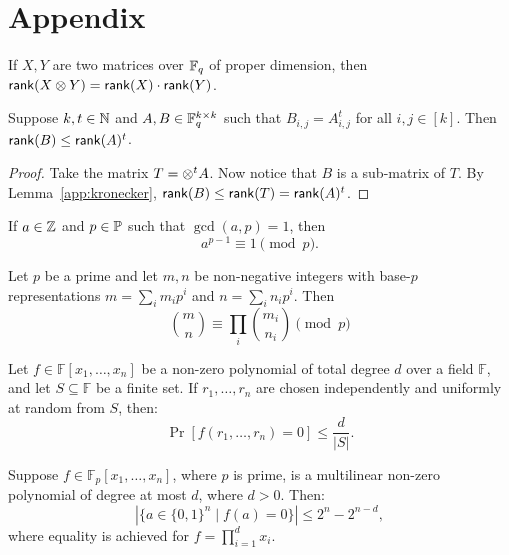 \chapter{Appendix}\label{app}

\begin{lemma}\label{app:kronecker}
    If $X, Y$ are two matrices over $\mathbb{F}_q$ of proper dimension, then $\mathsf{rank}(X\otimes Y) = \mathsf{rank}(X)\cdot\mathsf{rank}(Y)$.
\end{lemma}

\begin{lemma}\label{app:matrix power}
    Suppose $k, t\in\mathbb{N}$ and $A, B\in\mathbb{F}_q^{k\times k}$ such that $B_{i,j} = A_{i,j}^t$ for all $i,j\in[k]$. Then $\mathsf{rank}(B) \leq \mathsf{rank}(A)^t$.
\end{lemma}
\begin{proof}
    Take the matrix $T = \otimes^{t}A$. Now notice that $B$ is a sub-matrix of $T$. By Lemma~\ref{app:kronecker}, $\mathsf{rank}(B)\leq\mathsf{rank}(T) = \mathsf{rank}(A)^t$.
\end{proof}

\begin{lemma}\label{app:fermat}
    If $a\in\mathbb{Z}$ and $p\in\mathbb{P}$ such that $\gcd(a,p) = 1$, then 
    \[
            a^{p-1} \equiv 1 \pmod p.
    \]  
\end{lemma}

\begin{theorem}
\label{th:lucas}
Let $p$ be a prime and let $m, n$ be non-negative integers with base-$p$ representations
$m = \sum_{i} m_i p^i$ and $n = \sum_{i} n_i p^i$. Then
\[
\binom{m}{n} \equiv \prod_{i} \binom{m_i}{n_i} \pmod{p}
\]
\end{theorem}


\begin{lemma}
\label{app:sz}
Let $f \in \mathbb{F}[x_1, \ldots, x_n]$ be a non-zero polynomial of total degree $d$ over a field $\mathbb{F}$, and let $S \subseteq \mathbb{F}$ be a finite set. If $r_1, \ldots, r_n$ are chosen independently and uniformly at random from $S$, then:
\[
\Pr[f(r_1, \ldots, r_n) = 0] \leq \frac{d}{|S|}.
\]
\end{lemma}

\begin{lemma}\label{app:spl_sz}
Suppose $f \in \mathbb{F}_p[x_1, \ldots, x_n]$, where $p$ is prime, is a multilinear non-zero polynomial of degree at most $d$, where $d > 0$. Then:
\[
|\{a \in \{0,1\}^n \mid f(a) = 0\}| \leq 2^n - 2^{n-d},
\]
where equality is achieved for $f = \prod_{i=1}^{d} x_i$.
\end{lemma}

